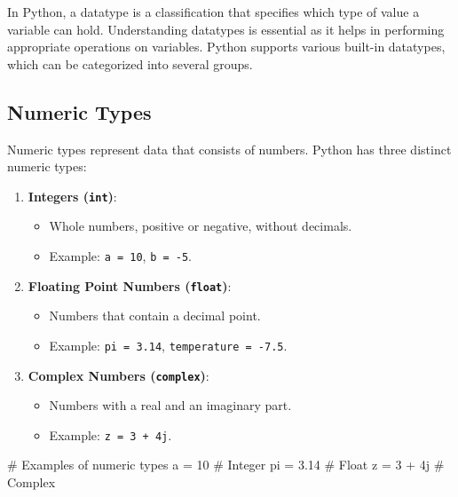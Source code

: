 \documentclass[
  letterpaper,
  DIV=11,
  numbers=noendperiod]{scrreprt}
\newenvironment{Shaded}{\begin{snugshade}}{\end{snugshade}}
\newcommand{\CommentTok}[1]{\textcolor[rgb]{0.37,0.37,0.37}{#1}}
\newcommand{\DecValTok}[1]{\textcolor[rgb]{0.68,0.00,0.00}{#1}}
\newcommand{\FloatTok}[1]{\textcolor[rgb]{0.68,0.00,0.00}{#1}}
\newcommand{\NormalTok}[1]{\textcolor[rgb]{0.00,0.23,0.31}{#1}}
\newcommand{\OperatorTok}[1]{\textcolor[rgb]{0.37,0.37,0.37}{#1}}
\newcommand{\OtherTok}[1]{\textcolor[rgb]{0.00,0.23,0.31}{#1}}
\providecommand{\tightlist}{%
  \setlength{\itemsep}{0pt}\setlength{\parskip}{0pt}}\usepackage{longtable,booktabs,array}
\theoremstyle{plain}
\theoremstyle{definition}
\theoremstyle{remark}
\begin{document}
In Python, a datatype is a classification that specifies which type of
value a variable can hold. Understanding datatypes is essential as it
helps in performing appropriate operations on variables. Python supports
various built-in datatypes, which can be categorized into several
groups.

\subsection{Numeric Types}\label{numeric-types}

Numeric types represent data that consists of numbers. Python has three
distinct numeric types:

\begin{enumerate}
\def\labelenumi{\arabic{enumi}.}
\tightlist
\item
  \textbf{Integers (\texttt{int})}:

  \begin{itemize}
  \tightlist
  \item
    Whole numbers, positive or negative, without decimals.
  \item
    Example: \texttt{a\ =\ 10}, \texttt{b\ =\ -5}.
  \end{itemize}
\item
  \textbf{Floating Point Numbers (\texttt{float})}:

  \begin{itemize}
  \tightlist
  \item
    Numbers that contain a decimal point.
  \item
    Example: \texttt{pi\ =\ 3.14}, \texttt{temperature\ =\ -7.5}.
  \end{itemize}
\item
  \textbf{Complex Numbers (\texttt{complex})}:

  \begin{itemize}
  \tightlist
  \item
    Numbers with a real and an imaginary part.
  \item
    Example: \texttt{z\ =\ 3\ +\ 4j}.
  \end{itemize}
\end{enumerate}

\begin{Shaded}
\begin{Highlighting}[]
\CommentTok{\# Examples of numeric types}
\NormalTok{a }\OperatorTok{=} \DecValTok{10}         \CommentTok{\# Integer}
\NormalTok{pi }\OperatorTok{=} \FloatTok{3.14}      \CommentTok{\# Float}
\NormalTok{z }\OperatorTok{=} \DecValTok{3} \OperatorTok{+} \OtherTok{4j}     \CommentTok{\# Complex}
\end{Highlighting}
\end{Shaded}
\end{document}
